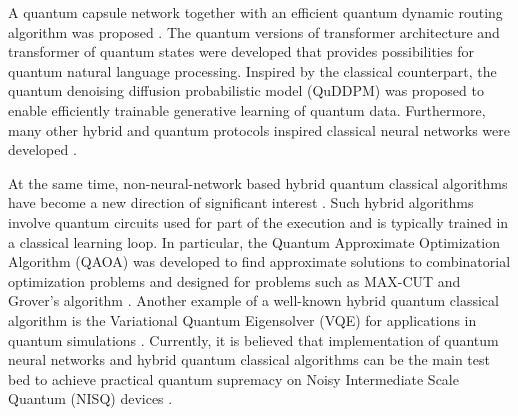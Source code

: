 \documentclass[pra,showkeys,twocolumn,showpacs,aps,10pt]{revtex4-1}
\begin{document}
A quantum capsule network together with an efficient quantum dynamic routing algorithm was proposed \cite{Liu2022}.
The quantum versions of transformer architecture and transformer of quantum states were developed\cite{Viteritti2023,cherratQuantumVisionTransformers2024,khatriQuixerQuantumTransformer2024,zhangTransformerQuantumState2023} that provides possibilities for quantum natural language processing. Inspired by the classical counterpart, the quantum denoising diffusion probabilistic model (QuDDPM) was proposed to enable efficiently trainable generative learning of quantum data\cite{zhangGenerativeQuantumMachine2024}.
Furthermore, many other hybrid and quantum protocols inspired classical neural networks were developed  \cite{kolleQuantumDenoisingDiffusion2024,li2019, Heese2022, killoran2019, bondarenko2019, dunjko2017, nautrup2019, foesel2018, rebentrost2018, purushothaman1997, verdon2019, cherny2019, byrnes2013, mishra2019, pyrkov2019, vinci2019, lu2019}.

At the same time, non-neural-network based hybrid quantum classical algorithms have become a new direction of significant interest \cite{mcclean2016,arute2020,akshay2020}.
Such hybrid algorithms involve quantum circuits used for part of the execution and is typically trained in a classical learning loop.
In particular, the Quantum Approximate Optimization Algorithm (QAOA) was developed to find approximate solutions to combinatorial optimization problems \cite{farhi2014,farhi2016}
and designed for problems such as MAX-CUT and Grover's algorithm \cite{arute2020,akshay2020,wang2018,jiang2017,huang2019,wecker2016,pagano2019,byrnes2018}.
Another example of a well-known hybrid quantum classical algorithm is the Variational Quantum Eigensolver (VQE) for applications in quantum simulations
\cite{kandala2017,aspuru-guzik2005,lanyon2010,peruzzo2014}.
Currently, it is believed that implementation of quantum neural networks and hybrid quantum classical algorithms can be the main test bed to achieve practical quantum supremacy on Noisy Intermediate Scale Quantum (NISQ) devices \cite{preskill2018,Bharti2022,Cerezo2021}.
\end{document}
